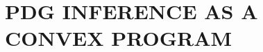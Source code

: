 \documentclass[twoside]{article}
\newcommand\discard[1]{}
\begin{document}
%



\discard{\color{gray!80!white}
    \section{AN EXPRESSIVE CLASS OF OPTIMIZATION PROBLMS}

    \begin{itemize}
        \item
        Many optimization problems can be effectively solved with
    \end{itemize}

    \begin{itemize}
        \item
        For optimization people: a new class of optimization problems,
    \end{itemize}

}

\section{PDG INFERENCE AS A CONVEX PROGRAM}
    \label{sec:inf-as-cvx-program}
\end{document}
